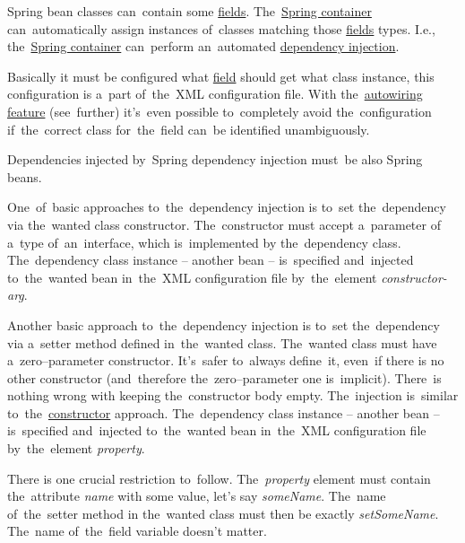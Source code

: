 \label{springdependencyinjection}
Spring bean classes can~contain some \hyperref[variablefieldproperty]{fields}.
The~\hyperref[springcontainrer]{Spring container} can~automatically assign instances of~classes matching those \hyperref[variablefieldproperty]{fields} types.
I.e., the~\hyperref[springcontainrer]{Spring container} can~perform an~automated \hyperref[dependencyinjection]{dependency injection}.

Basically it must be configured what \hyperref[variablefieldproperty]{field} should get what class instance, this configuration is a~part of~the~XML configuration file.
With the~\hyperref[autowiring]{autowiring feature} (see~further) it's~even possible to~completely avoid the~configuration if~the~correct class for~the~field can~be identified unambiguously.

\note Dependencies injected by~Spring dependency injection must~be also Spring beans.

\label{constructorinjection}
One~of~basic approaches to~the~dependency injection is to~set the~dependency via the~wanted class constructor.
The~constructor must accept a~parameter of a~type of~an~interface, which is~implemented by the~dependency class.
The~dependency class instance -- another bean --  is~specified and~injected to~the~wanted bean in~the~XML configuration file by~the~element \textit{constructor-arg}.

\label{setterinjection}
Another basic approach to~the~dependency injection is to~set the~dependency via a~setter method defined in~the~wanted class.
The~wanted class must have a~zero--parameter constructor.
It's~safer to~always define~it, even~if there is no other constructor (and~therefore the~zero--parameter one is~implicit).
There~is nothing wrong with keeping the~constructor body empty.
The~injection is~similar to~the~\hyperref[constructorinjection]{constructor} approach.
The~dependency class instance -- another bean --  is~specified and~injected to~the~wanted bean in~the~XML configuration file by~the~element \textit{property}.

\warning There is one crucial restriction to~follow.
The~\textit{property} element must contain the~attribute \textit{name} with some value, let's say \textit{someName}.
The~name of~the~setter method in the~wanted class must then be exactly \textit{setSomeName}.
The~name of~the~field variable doesn't matter.

